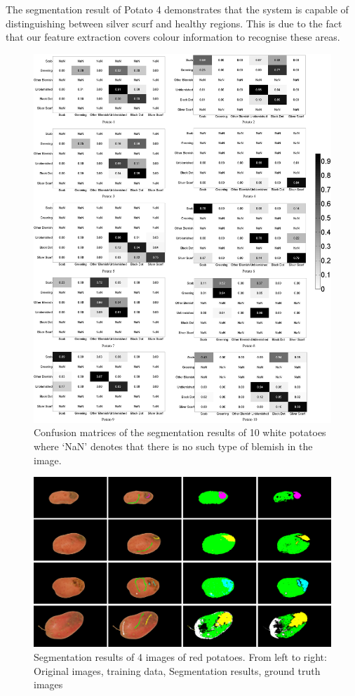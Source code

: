 \documentclass[twocolumn]{svjour3}          %
\begin{document}
The segmentation result of Potato 4 demonstrates that the system is capable of distinguishing between silver scurf and healthy regions. This is due to the fact that our feature extraction  covers colour information  to recognise these areas.
\begin{figure} [htbp!]
\centering
\includegraphics[width=1\linewidth]{r2.jpg}
\caption{Confusion matrices of the segmentation results of 10 white potatoes where `NaN' denotes that there is no such type of blemish in the image.}
\label{fig:r2}
\end{figure}
\begin{figure} [t]
\centering
\includegraphics[width=1\linewidth]{r3.jpg}
\caption{Segmentation results of 4 images of red potatoes. From left to right: Original images, training data, Segmentation results, ground truth images}
\label{fig:r3}
\end{figure}
\end{document}
